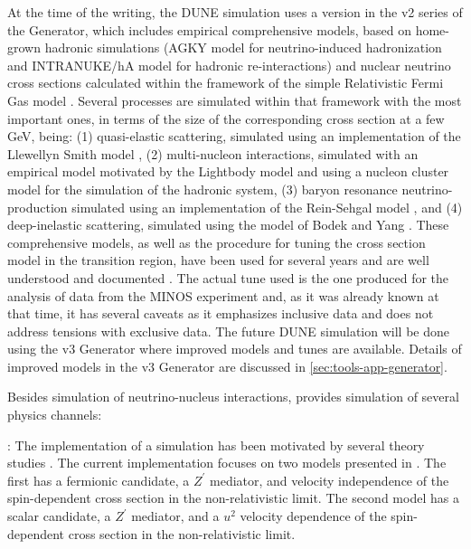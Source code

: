 At the time of the  writing, the DUNE simulation uses a version in the v2 series of the  Generator, which includes empirical comprehensive models, based on home-grown hadronic simulations (AGKY model \cite{Yang:2009zx} for neutrino-induced hadronization and INTRANUKE/hA model \cite{Dytman:2015taa} for hadronic re-interactions) and nuclear neutrino cross sections calculated within the framework of the simple Relativistic Fermi Gas model \cite{Bodek:1981wr}. Several processes are simulated within that framework with the most important ones, in terms of the size of the corresponding cross section at a few GeV, being: (1) quasi-elastic scattering, simulated using an implementation of the Llewellyn Smith model \cite{LlewellynSmith:1971uhs}, (2) multi-nucleon interactions, simulated with an empirical model motivated by the Lightbody model \cite{Lightbody:1988gcu} and using a nucleon cluster model for the simulation of the hadronic system, (3) baryon resonance neutrino-production simulated using an implementation of the Rein-Sehgal model \cite{Rein:1980wg}, and (4) deep-inelastic scattering, simulated using the model of Bodek and Yang \cite{Bodek:2002ps}.  These comprehensive models, as well as the  procedure for tuning the cross section model in the transition region, have been used for several years and are well understood and documented \cite{Andreopoulos:2009rq}. The actual tune used is the one produced for the analysis of data from the MINOS experiment and, as it was already known at that time, it has several caveats as it emphasizes inclusive data and does not address tensions with exclusive data. The future DUNE simulation will be done using the v3  Generator where improved models and tunes are available. Details of improved models in the v3  Generator are discussed in \ref{sec:tools-app-generator}. %



Besides simulation of neutrino-nucleus interactions,  provides simulation of several  physics channels:

\textit{}: The implementation of a   simulation has been motivated by several theory studies \cite{Agashe:2014yua, 
Berger:2014sqa, Kong:2014mia, Cherry:2015oca, Kopp:2015bfa, Necib:2016aez, Alhazmi:2016qcs, Kim:2016zjx}. The current implementation focuses on two models presented in  \cite{Berger:2014sqa}. The first has a fermionic  candidate, a $Z^\prime$ mediator, and velocity independence of the spin-dependent cross section in the non-relativistic limit. The second model has a scalar  candidate, a $Z^\prime$ mediator, and a $u^2$ velocity dependence of the spin-dependent cross section in the non-relativistic limit.

